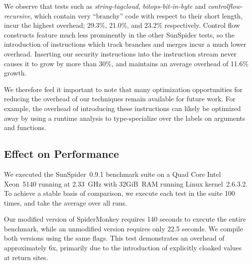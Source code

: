 We observe that tests such as \textit{string-tagcloud}, \textit{bitops-bit-in-byte} and \textit{controlflow-recursive}, which contain very ``branchy'' code with respect to their short length, incur the highest overhead; 29.3\%, 21.0\%, and 23.2\% respectively.
Control flow constructs feature much less prominently in the other SunSpider tests, so the introduction of instructions which track branches and merges incur a much lower overhead.
Inserting our security instructions into the instruction stream never causes it to grow by more than 30\%, and maintains an average overhead of 11.6\% growth.

We therefore feel it important to note that many optimization opportunities for reducing the overhead of our techniques remain available for future work.
For example, the overhead of introducing these instructions can likely be optimized away by using a runtime analysis to type-specialize over the labels on arguments and functions.

\subsection{Effect on Performance}
\label{sec:evaluation-performance}

We executed the SunSpider~0.9.1 benchmark suite on a Quad Core Intel Xeon~5140 running at 2.33~GHz with 32GiB~RAM running Linux kernel~2.6.3.2.
To achieve a stable basis of comparison, we execute each test in the suite 100 times, and take the average over all runs.

Our modified version of SpiderMonkey requires 140 seconds to execute the entire benchmark, while an unmodified version requires only 22.5 seconds.
We compile both versions using the same flags.
This test demonstrates an overhead of approximately 6x, primarily due to the introduction of explicitly cloaked values at return sites.

